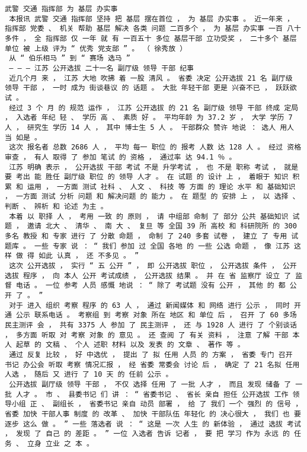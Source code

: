 \documentclass{article}
\begin{document}
\begin{Verbatim}[commandchars=\\\{\}]
 武警 交通 指挥部 为 基层 办实事 
 本报讯 武警 交通 指挥部 坚持 把 基层 摆在首位 ， 为 基层 办实事 。 近一年来 ， 指挥部 党委 、 机关 帮助 基层 解决 各类 问题 二百多个 ， 为 基层 办实事 一百 八十多件 ， 全 指挥部 仅 一年 就 有 一百五十 多位 基层干部 立功受奖 ， 二十多个 基层单位 被 上级 评为 “ 优秀 党支部 ” 。 （ 徐秀放 ） 
 从 “ 伯乐相马 ” 到 “ 赛场 选马 ” 
 — — — 江苏 公开选拔 二十一名 副厅级 领导 干部 纪事 
 近几个月 来 ， 江苏 大地 吹拂 着 一股 清风 。 省委 决定 公开选拔 21 名 副厅级 领导 干部 ， 一时 成为 街谈巷议 的 话题 。 大批 年轻干部 更是 兴奋不已 ， 跃跃欲试 。 
 经过 3 个 月 的 规范 运作 ， 江苏 公开选拔 的 21 名 副厅级 领导 干部 终成 定局 ， 入选者 年纪 轻 、 学历 高 、 素质 好 。 平均年龄 为 37.2 岁 ， 大学 学历 7 人 ， 研究生 学历 14 人 ， 其中 博士生 5 人 。 干部群众 赞许 地说 ： 选人 用人 当 如是 。 
 这次 报名者 总数 2686 人 ， 平均 每一 职位 的 报考 人数 达 128 人 。 经过 资格 审查 ， 有人 取得 了 参加 笔试 的 资格 ， 通过率 达 94.1 ％ 。 
 江苏 明确 表示 ， 公开选拔 干部 考试 不是 升学考试 ， 也 不是 职称 考试 ， 就是 要 考出 能 胜任 副厅级 职位 的 领导 人才 。 在 试题 的 设计 上 ， 着眼于 知识 积累 和 运用 ， 一方面 测试 社科 、 人文 、 科技 等 方面 的 理论 水平 和 基础知识 ， 一方面 测试 分析 问题 和 解决问题 的 能力 。 在 题型 的 安排 上 ， 以 选择 、 判断 、 辨析 和 论述 为主 。 
 本着 以 职择 人 ， 考用 一致 的 原则 ， 请 中组部 命制 了 部分 公共 基础知识 试题 ， 邀请 北大 、 清华 、 南 大 、 复旦 等 全国 39 所 高校 和 科研院所 的 300 多名 教授 和 专家 进行 了 分散 命题 ， 命制 了 240 多套 试卷 ， 建立 了 专用 试题库 。 一些 专家 说 ： “ 我们 参加 过 全国 各地 的 一些 公选 命题 ， 像 江苏 这样 做 得 如此 认真 ， 还 不多见 。 ” 
 这次 公开选拔 ， 实行 “ 五 公开 ” ， 即 公开选拔 职位 ， 公开选拔 条件 ， 公开选拔 程序 ， 向 本人 公开 考试成绩 ， 公开选拔 结果 。 并 在 省 监察厅 设立 了 监督 电话 。 一位 参考 人员 感慨 地说 ： “ 除了 考试题 没有 公开 ， 其他 的 都 公开 了 。 ” 
 对于 进入 组织 考察 程序 的 63 人 ， 通过 新闻媒体 和 网络 进行 公示 ， 同时 开通 公示 联系电话 。 考察组 到 考察 对象 所在 地区 和 单位 后 ， 召开 了 60 多场 民主测评 会 ， 共有 3375 人 参加 了 民主测评 ， 还 与 1928 人 进行 了 个别谈话 ， 多方面 听取 对 考察 对象 的 意见 。 还 查阅 了 有关 资料 ， 注意 了解 干部 本人 起草 的 文稿 、 个人 述职 材料 以及 发表 的 文章 、 著作 等 。 
 通过 反复 比较 ， 好 中选优 ， 提出 了 拟 任用 人员 的 方案 ， 省委 专门 召开 书记 办公会 听取 考察 情况汇报 ， 经 省委 常委会 讨论 后 ， 确定 了 21 名拟 任用 人选 ， 随后 又 进行 了 10 天 的 任前 公示 。 
 公开选拔 副厅级 领导 干部 ， 不仅 选择 任用 了 一批 人才 ， 而且 发现 储备 了 一批 人才 。 市 、 县委书记 们 讲 ： “ 省委书记 、 省长 亲自 担任 公开选拔 工作 领导小组 正 、 副组长 ， 省委书记 亲自 动员 部署 ， 给 了 我们 一个 强烈 的 信号 ， 省委 加快 干部人事 制度 的 改革 、 加快 干部队伍 年轻化 的 决心很大 ， 我们 也 要 逐步 这么 做 。 ” 一些 落选者 说 ： “ 这是 一次 人生 的 新体验 ， 通过 选拔 考试 ， 发现 了 自己 的 差距 。 ” 一位 入选者 告诉 记者 ， 要 把 学习 作为 永远 的 任务 、 立身 立业 之 本 。 

\end{Verbatim}
\end{document}
